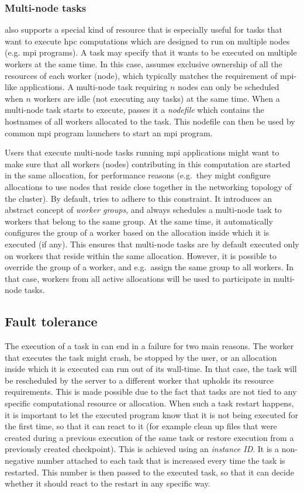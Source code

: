 \subsubsection*{Multi-node tasks}
\hyperqueue{} also supports a special kind of resource that is especially useful for
tasks that want to execute \gls{hpc} computations which are designed to run on
multiple nodes (e.g. \gls{mpi} programs). A task may specify that it wants to be
executed on multiple workers at the same time. In this case, \hq{} assumes
exclusive ownership of all the resources of each worker (node), which typically matches the
requirement of \gls{mpi}-like applications. A multi-node task requiring
$n$ nodes can only be scheduled when $n$ workers are idle
(not executing any tasks) at the same time. When a multi-node task starts to execute,
\hq{} passes it a \emph{nodefile} which contains the hostnames of all
workers allocated to the task. This nodefile can then be used by common \gls{mpi}
program launchers to start an \gls{mpi} program.

Users that execute multi-node tasks running \gls{mpi} applications might want to make
sure that all workers (nodes) contributing in this computation are started in the same allocation,
for performance reasons (e.g.\ they might configure allocations to use nodes that reside close
together in the networking topology of the cluster). By default, \hyperqueue{} tries to
adhere to this constraint. It introduces an abstract concept of \emph{worker groups}, and always
schedules a multi-node task to workers that belong to the same group. At the same time, it
automatically configures the group of a worker based on the allocation inside which it is executed
(if any). This ensures that multi-node tasks are by default executed only on workers that reside
within the same allocation. However, it is possible to override the group of a worker, and e.g.\
assign the same group to all workers. In that case, workers from all active allocations will be
used to participate in multi-node tasks.

\subsection{Fault tolerance}
The execution of a task in \hyperqueue{} can end in a failure for two main reasons. The
worker that executes the task might crash, be stopped by the user, or an allocation inside which it
is executed can run out of its wall-time. In that case, the task will be rescheduled by the server
to a different worker that upholds its resource requirements. This is made possible due to the fact
that tasks are not tied to any specific computational resource or allocation. When such a task
restart happens, it is important to let the executed program know that it is not being executed for
the first time, so that it can react to it (for example clean up files that were created during a
previous execution of the same task or restore execution from a previously created checkpoint).
This is achieved using an \emph{instance ID}. It is a non-negative number attached to each
task that is increased every time the task is restarted. This number is then passed to the executed
task, so that it can decide whether it should react to the restart in any specific way.

